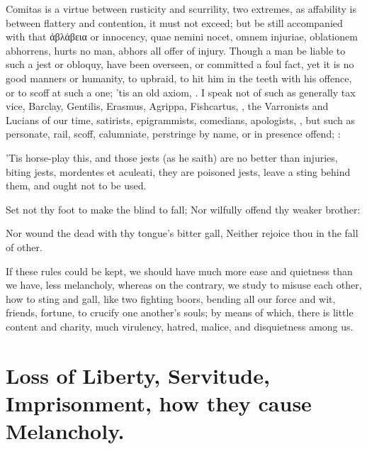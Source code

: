 {Comitas is a virtue between rusticity and scurrility, two extremes, as
affability is between flattery and contention, it must not exceed; but
be still accompanied with that \textgreek[variant=ancient]{ἀβλάβεια} or innocency, quae nemini
nocet, omnem injuriae, oblationem abhorrens, hurts no man, abhors all
offer of injury. Though a man be liable to such a jest or obloquy, have
been overseen, or committed a foul fact, yet it is no good manners or
humanity, to upbraid, to hit him in the teeth with his offence, or to
scoff at such a one; 'tis an old axiom, . I speak not of such as generally tax vice, Barclay,
Gentilis, Erasmus, Agrippa, Fishcartus, \etc{}, the Varronists and Lucians
of our time, satirists, epigrammists, comedians, apologists, \etc{}, but
such as personate, rail, scoff, calumniate, perstringe by name, or in
presence offend;
:

'Tis horse-play this, and those jests (as he saith) are no better
than injuries, biting jests, mordentes et aculeati, they are poisoned
jests, leave a sting behind them, and ought not to be used.

Set not thy foot to make the blind to fall;
Nor wilfully offend thy weaker brother:

Nor wound the dead with thy tongue's bitter gall,
Neither rejoice thou in the fall of other.

If these rules could be kept, we should have much more ease and
quietness than we have, less melancholy, whereas on the contrary, we
study to misuse each other, how to sting and gall, like two fighting
boors, bending all our force and wit, friends, fortune, to crucify
one another's souls; by means of which, there is little content
and charity, much virulency, hatred, malice, and disquietness among us.

\section[Loss of Liberty, Servitude]{Loss of Liberty, Servitude, Imprisonment, how they cause Melancholy.}

}
